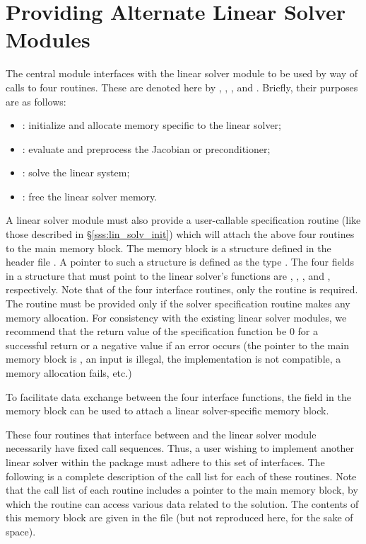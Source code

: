 \chapter{Providing Alternate Linear Solver Modules}\label{s:new_linsolv}
The central {\cvode} module interfaces with the linear solver module to be
used by way of calls to four routines.  These are denoted here by 
, , , and .
Briefly, their purposes are as follows:
\begin{itemize}
\item {}: initialize and allocate memory specific to the
  linear solver;
\item {}: evaluate and preprocess the Jacobian or preconditioner;
\item {}: solve the linear system;
\item {}: free the linear solver memory.
\end{itemize}
A linear solver module must also provide a user-callable specification
routine (like those described in \S\ref{sss:lin_solv_init}) which will
attach the above four routines to the main {\cvode} memory block.
The {\cvode} memory block is a structure defined in the header file
.  A pointer to such a structure is defined as the
type .  The four fields in a  structure that
must point to the linear solver's functions are ,
, , and , respectively.
Note that of the four interface routines, only the  routine
is required.  The  routine must be provided only if the solver
specification routine makes any memory allocation.
For consistency with the existing {\cvode} linear solver modules, we
recommend that the return value of the specification function be 0 for
a successful return or a negative value if an error occurs (the
pointer to the main {\cvode} memory block is , an input is
illegal, the {\nvector} implementation is not compatible, a memory
allocation fails, etc.)

To facilitate data exchange between the four interface functions, the
field  in the {\cvode} memory block can be used to attach
a linear solver-specific memory block.

These four routines that interface between {\cvode} and the linear solver module
necessarily have fixed call sequences.  Thus, a user wishing to implement another 
linear solver within the {\cvode} package must adhere to this set of interfaces.
The following is a complete description of the call list for each of
these routines.  Note that the call list of each routine includes a
pointer to the main {\cvode} memory block, by which the routine can access
various data related to the {\cvode} solution.  The contents of this memory
block are given in the file  (but not reproduced here, for
the sake of space).

